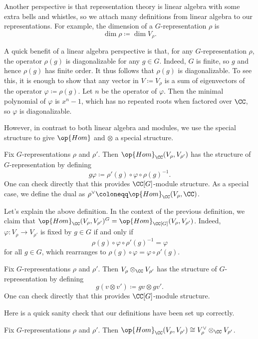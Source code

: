 \documentclass[../main.tex]{subfiles}
\begin{document}
Another perspective is that representation theory is linear algebra with some extra bells and whistles, so we attach many definitions from linear algebra to our representations. For example, the dimension of a $G$-representation $\rho$ is
\[\dim\rho\coloneqq\dim V_\rho.\]
\begin{remark} \label{rem:reps-are-diagonalizable}
	A quick benefit of a linear algebra perspective is that, for any $G$-representation $\rho$, the operator $\rho(g)$ is diagonalizable for any $g\in G$. Indeed, $G$ is finite, so $g$ and hence $\rho(g)$ has finite order. It thus follows that $\rho(g)$ is diagonalizable. To see this, it is enough to show that any vector in $V\coloneqq V_\rho$ is a sum of eigenvectors of the operator $\varphi\coloneqq\rho(g)$. Let $n$ be the operator of $\varphi$. Then the minimal polynomial of $\varphi$ is $x^n-1$, which has no repeated roots when factored over $\CC$, so $\varphi$ is diagonalizable.
\end{remark}
However, in contrast to both linear algebra and modules, we use the special structure to give $\op{Hom}$ and $\otimes$ a special structure.
\begin{definition}
	Fix $G$-representations $\rho$ and $\rho'$. Then $\op{Hom}_\CC(V_\rho,V_{\rho'})$ has the structure of $G$-representation by defining
	\[g\varphi\coloneqq\rho'(g)\circ\varphi\circ\rho(g)^{-1}.\]
	One can check directly that this provides $\CC[G]$-module structure. As a special case, we define the dual as $\rho^\lor\coloneqq\op{Hom}_\CC(V_\rho,\CC)$.
\end{definition}
\begin{remark} \label{rem:hom-invariants}
	Let's explain the above definition. In the context of the previous definition, we claim that $\op{Hom}_\CC(V_\rho,V_{\rho'})^G=\op{Hom}_{\CC[G]}(V_\rho,V_{\rho'})$. Indeed, $\varphi\colon V_\rho\to V_{\rho'}$ is fixed by $g\in G$ if and only if
	\[\rho(g)\circ\varphi\circ\rho'(g)^{-1}=\varphi\]
	for all $g\in G$, which rearranges to $\rho(g)\circ\varphi=\varphi\circ\rho'(g)$.
\end{remark}
\begin{definition}
	Fix $G$-representations $\rho$ and $\rho'$. Then $V_\rho\otimes_\CC V_{\rho'}$ has the structure of $G$-representation by defining
	\[g(v\otimes v')\coloneqq gv\otimes gv'.\]
	One can check directly that this provides $\CC[G]$-module structure.
\end{definition}
Here is a quick sanity check that our definitions have been set up correctly.
\begin{lemma} \label{lem:hom-is-dual-tensor}
	Fix $G$-representations $\rho$ and $\rho'$. Then $\op{Hom}_\CC(V_\rho,V_{\rho'})\cong V_\rho^\lor\otimes_\CC V_{\rho'}$.
\end{lemma}
\end{document}
